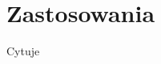 \chapter{Zastosowania}
Cytuje\cite{ICaWoETiTAPise2010PhysiologicalmonitoringsystemformobilehealthcareapplicationsAppliedcomputingLifeandmedicalsciences}

\label{cha:zastosowania}